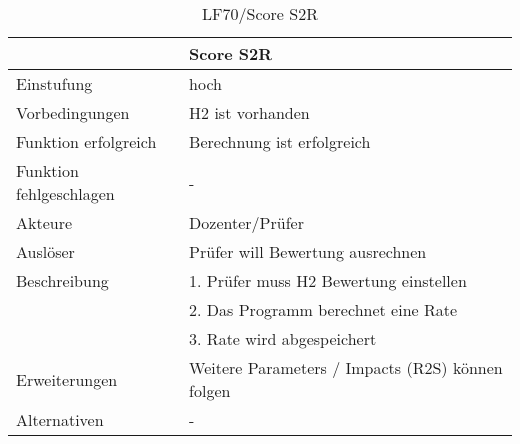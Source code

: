 	\begin{table}[H]
		\centering
		\caption{LF70/Score S2R}
		\begin{tabularx}{\textwidth}{l|X}
			\toprule
			                        & Score S2R                                        \\ \midrule
			Einstufung              & hoch                                             \\
			Vorbedingungen          & H2 ist vorhanden                                 \\
			Funktion erfolgreich    & Berechnung ist erfolgreich                       \\
			Funktion fehlgeschlagen & -                                                \\
			Akteure                 & Dozenter/Prüfer                                  \\
			Auslöser                & Prüfer will Bewertung ausrechnen                 \\
			Beschreibung            & 1. Prüfer muss H2 Bewertung einstellen           \\
			                        & 2. Das Programm berechnet eine Rate              \\
			                        & 3. Rate wird abgespeichert                       \\
			Erweiterungen           & Weitere Parameters / Impacts (R2S) können folgen \\
			Alternativen            & -                                                \\ \bottomrule
		\end{tabularx}%
		\label{tab:LF70S2R}%
	\end{table}%

